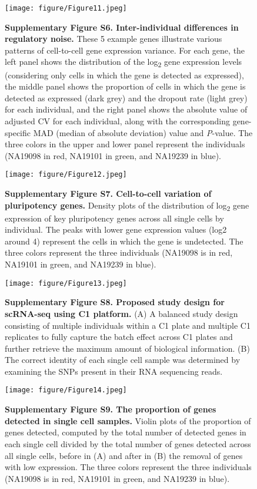 \begin{figure}[htbp]
\centering
\texttt{[image: figure/Figure11.jpeg]}
\caption{\textbf{Supplementary Figure S6. Inter-individual differences
in regulatory noise.} These 5 example genes illustrate various patterns
of cell-to-cell gene expression variance. For each gene, the left panel
shows the distribution of the log\textsubscript{2} gene expression
levels (considering only cells in which the gene is detected as
expressed), the middle panel shows the proportion of cells in which the
gene is detected as expressed (dark grey) and the dropout rate (light
grey) for each individual, and the right panel shows the absolute value
of adjusted CV for each individual, along with the corresponding
gene-specific MAD (median of absolute deviation) value and
\emph{P}-value. The three colors in the upper and lower panel represent
the individuals (NA19098 in red, NA19101 in green, and NA19239 in
blue).}
\end{figure}

\begin{figure}[htbp]
\centering
\texttt{[image: figure/Figure12.jpeg]}
\caption{\textbf{Supplementary Figure S7. Cell-to-cell variation of
pluripotency genes.} Density plots of the distribution of
log\textsubscript{2} gene expression of key pluripotency genes across
all single cells by individual. The peaks with lower gene expression
values (log2 around 4) represent the cells in which the gene is
undetected. The three colors represent the three individuals (NA19098 is
in red, NA19101 in green, and NA19239 in blue).}
\end{figure}

\begin{figure}[htbp]
\centering
\texttt{[image: figure/Figure13.jpeg]}
\caption{\textbf{Supplementary Figure S8. Proposed study design for
scRNA-seq using C1 platform.} (A) A balanced study design consisting of
multiple individuals within a C1 plate and multiple C1 replicates to
fully capture the batch effect across C1 plates and further retrieve the
maximum amount of biological information. (B) The correct identity of
each single cell sample was determined by examining the SNPs present in
their RNA sequencing reads.}
\end{figure}

\begin{figure}[htbp]
\centering
\texttt{[image: figure/Figure14.jpeg]}
\caption{\textbf{Supplementary Figure S9. The proportion of genes
detected in single cell samples.} Violin plots of the proportion of
genes detected, computed by the total number of detected genes in each
single cell divided by the total number of genes detected across all
single cells, before in (A) and after in (B) the removal of genes with
low expression. The three colors represent the three individuals
(NA19098 is in red, NA19101 in green, and NA19239 in blue).}
\end{figure}

